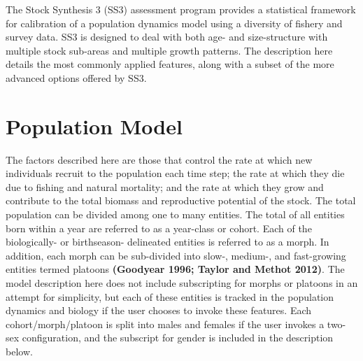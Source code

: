 \documentclass[11pt,
  english,
  letterpaper,
]{article}
\begin{document}
\pagebreak
{}
\setcounter{page}{1}

\renewcommand{\thetable}{\roman{table}}
\renewcommand{\thefigure}{\roman{figure}}

\setlength\parskip{0.5em plus 0.1em minus 0.2em}

\pagebreak
\setlength{\parskip}{5mm plus1mm minus1mm}
\setcounter{page}{1}
\renewcommand{\thefigure}{\arabic{figure}}
\renewcommand{\thetable}{\arabic{table}}
\setcounter{table}{0}
\setcounter{figure}{0}


The Stock Synthesis 3 (SS3) assessment program provides a statistical framework for calibration of a population dynamics model using a diversity of fishery and survey data. SS3 is designed to deal with both age- and size-structure with multiple stock sub-areas and multiple growth patterns. The description here details the most commonly applied features, along with a subset of the more advanced options offered by SS3.

\leavevmode\tagmcend\tagstructend\par


\hypertarget{population-model}{%
\section{Population Model}\label{population-model}}

\leavevmode\tagmcend\tagstructend


The factors described here are those that control the rate at which new individuals recruit to the population each time step; the rate at which they die due to fishing and natural mortality; and the rate at which they grow and contribute to the total biomass and reproductive potential of the stock. The total population can be divided among one to many entities. The total of all entities born within a year are referred to as a year-class or cohort. Each of the biologically- or birthseason- delineated entities is referred to as a morph. In addition, each morph can be sub-divided into slow-, medium-, and fast-growing entities termed platoons \textbf{(Goodyear 1996; Taylor and Methot 2012)}. The model description here does not include subscripting for morphs or platoons in an attempt for simplicity, but each of these entities is tracked in the population dynamics and biology if the user chooses to invoke these features. Each cohort/morph/platoon is split into males and females if the user invokes a two-sex configuration, and the subscript for gender is included in the description below.
\end{document}
